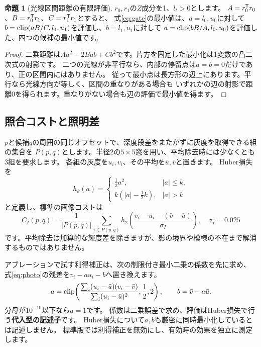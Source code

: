 \documentclass[a4paper,11pt]{ltjsarticle}
\theoremstyle{definition}
\newtheorem{proposition}[definition]{命題}\newtheorem{remark}[definition]{注意}
\begin{document}
\begin{proposition}[光線区間距離の有限評価]
$r_0,r_1$の$Z$成分を1、$l_t>0$とします。
$A=r_0^\mathsf T r_0$、$B=r_0^\mathsf T r_1$、$C=r_1^\mathsf T r_1$とすると、
式\eqref{eq:gate}の最小値は、$a=l_0,u_0$に対して
$b=\operatorname{clip}(aB/C,l_1,u_1)$を評価し、$b=l_1,u_1$に対して
$a=\operatorname{clip}(bB/A,l_0,u_0)$を評価した、四つの候補の最小値です。
\end{proposition}
\begin{proof}
二乗距離は$Aa^2-2Bab+Cb^2$です。片方を固定した最小化は1変数の凸二次式の射影です。
二つの光線が非平行なら、内部の停留点は$a=b=0$だけであり、正の区間内にはありません。
従って最小点は長方形の辺上にあります。平行なら光線方向が等しく、区間の重なりがある場合も
いずれかの辺の射影で距離0を得られます。重なりがない場合も辺の評価で最小値を得ます。
\end{proof}

\subsection{照合コストと照明差}
$p$と候補$q$の周囲の同じオフセットで、深度段差をまたがずに灰度を取得できる組の集合を
$P(p,q)$とします。半径2の$5\times5$窓を用い、平均除去時には少なくとも3組を要求します。
各組の灰度を$u_i,v_i$、その平均を$\bar u,\bar v$と置きます。
Huber損失を
\begin{equation}\label{eq:huber}
h_k(a)=\begin{cases}\frac12a^2,&|a|\le k,\\ k(|a|-\frac12k),&|a|>k\end{cases}
\end{equation}
と定義し、標準の画像コストは
\begin{equation}\label{eq:photo}
C_I(p,q)=\frac{1}{|P(p,q)|}\sum_{i\in P(p,q)}
h_2\!\left(\frac{v_i-u_i-(\bar v-\bar u)}{\sigma_I}\right),\quad \sigma_I=0.025
\end{equation}
です。平均除去は加算的な輝度差を除きますが、影の境界や模様の不在まで解消するものではありません。

アブレーションで試す利得補正は、次の制限付き最小二乗の係数を先に求め、
式\eqref{eq:photo}の残差を$v_i-a u_i-b$へ置き換えます。
\begin{equation}\label{eq:gain}
a=\operatorname{clip}\!\left(\frac{\sum_i(u_i-\bar u)(v_i-\bar v)}{\sum_i(u_i-\bar u)^2},\frac12,2\right),
\qquad b=\bar v-a\bar u.
\end{equation}
分母が$10^{-10}$以下なら$a=1$です。
係数は二乗誤差で求め、評価はHuber損失で行う\textbf{代入型の記述子}です。
Huber損失について$a,b$も厳密に同時最小化しているとは記述しません。
標準版では利得補正を無効にし、有効時の効果を独立に測定します。
\end{document}
